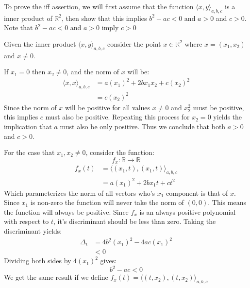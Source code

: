 \documentclass[letterpaper,10pt]{article}
\begin{document}
\begin{enumerate}
\begin{enumerate}[a)]
		To prove the iff assertion, we will first assume that the function $\langle x , y \rangle _{a,b,c} $ is a inner product of $\mathbb{R}^2$, then show that this implies $b^2 - ac < 0$ and $a > 0$ and $c > 0$. Note that $b^2 - ac < 0$ and $a > 0$ imply $c > 0$

		Given the inner product $\langle x , y \rangle _{a,b,c} $ consider the point $x \in \mathbb{R}^2$ where $x = (x_{1},x_{2})$ and $x \neq 0$.

		If $x_{1} = 0$ then $x_{2} \neq 0$, and the norm of $x$ will be:
		\begin{align*}
			\langle x, x \rangle _{a,b,c} & = a (x_{1})^2 + 2b x_{1} x_{2} + c (x_{2})^2 \\
			 & = c (x_{2})^2
		\end{align*}
		Since the norm of $x$ will be positive for all values $x \neq 0$ and $x_{2}^2$ must be positive, this implies $c$ must also be positive. Repeating this process for $x_{2} = 0$ yields the implication that $a$ must also be only positive. Thus we conclude that both $a > 0$ and $c > 0$.

		For the case that $x_{1}, x_{2} \neq 0$, consider the function:
		$$ f_x : \mathbb{R} \rightarrow \mathbb{R} $$
		\begin{align*}
			f_x(t) &= \langle (x_{1}, t), (x_{1}, t) \rangle _{a,b,c} \\
			& = a (x_{1})^2 + 2b x_{1} t + c t^2
		\end{align*}
		Which parameterizes the norm of all vectors who's $x_1$ component is that of $x$. Since $x_1$ is non-zero the function will never take the norm of $(0,0)$. This means the function will always be positive. Since $f_x$ is an always positive polynomial with respect to $t$, it's discriminant should be less than zero. Taking the discriminant yields:
		\begin{align*}
			\Delta_t &= 4b^2(x_1)^2 - 4ac(x_1)^2 \\
			& < 0
		\end{align*}
		Dividing both sides by $4(x_1)^2$ gives:
		$$ b^2 - ac < 0$$
		We get the same result if we define $f_x(t) = \langle (t, x_{2}), (t, x_{2}) \rangle _{a,b,c}$




\end{enumerate}
\end{enumerate}
\end{document}
